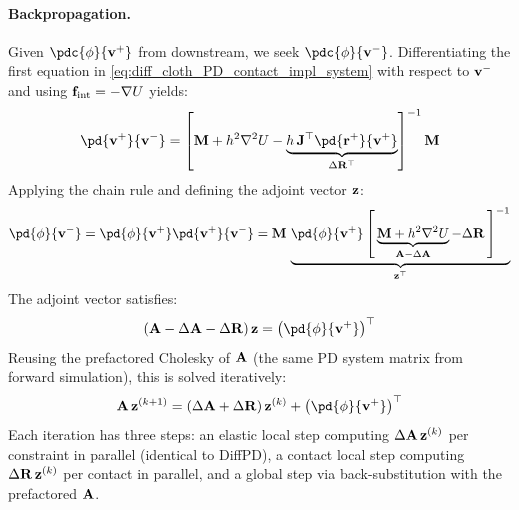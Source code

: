 \paragraph{Backpropagation.} Given $\pdc{\phi}{\vv^+}$ from downstream, we seek $\pdc{\phi}{\vv^-}$. Differentiating the first equation in \eqref{eq:diff_cloth_PD_contact_impl_system} with respect to $\mathbf{v}^-$ and using $\mathbf{f}_{\text{int}} = -\nabla U$ yields:
\begin{equation}
    \pd{\vv^+}{\vv^-} = \left[\M + h^2 \nabla^2 U - \underbrace{h\,\mathbf{J}^\top\pd{\rr^+}{\vv^+}}_{\Delta\R^\top}\right]^{-1}\M
\end{equation}
Applying the chain rule and defining the adjoint vector $\mathbf{z}$:
\begin{equation}
    \pd{\phi}{\vv^-} = 
    \pd{\phi}{\vv^+}\pd{\vv^+}{\vv^-} = 
    \M\,
    \underbrace{
        \pd{\phi}{\vv^+}
        \left[\,
        \underbrace{\M + h^2\nabla^2 U}_{\A - \Delta\A} - \Delta\R
        \,\right]^{-1}
    }_{\z^\top}
\end{equation}
The adjoint vector satisfies:
\begin{equation}
    (\A - \Delta\A - \Delta\R)\,\z = \left(\pd{\phi}{\vv^+}\right)^\top
\end{equation}
Reusing the prefactored Cholesky of $\mathbf{A}$ (the same PD system matrix from forward simulation), this is solved iteratively:
\begin{equation}
    \A\,\z^{(k+1)} = (\Delta\A + \Delta\R)\,\z^{(k)} + \left(\pd{\phi}{\vv^+}\right)^\top
\end{equation}
Each iteration has three steps: an elastic local step computing $\Delta\mathbf{A}\,\mathbf{z}^{(k)}$ per constraint in parallel (identical to DiffPD), a contact local step computing $\Delta\mathbf{R}\,\mathbf{z}^{(k)}$ per contact in parallel, and a global step via back-substitution with the prefactored $\mathbf{A}$.

